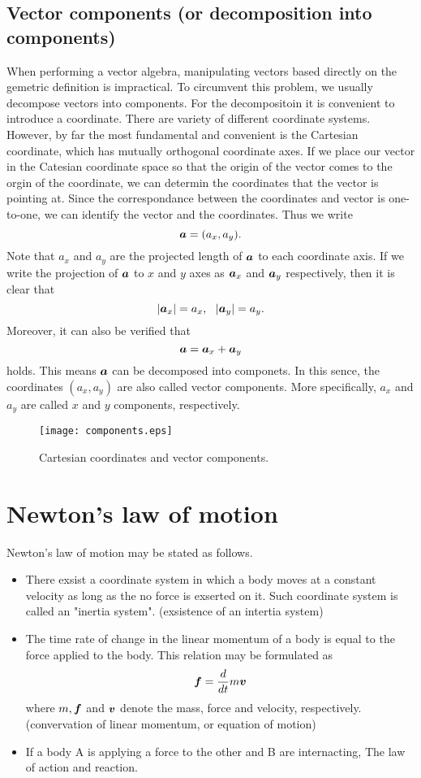 \documentclass[10pt,a4j]{article}
\begin{document}
\subsection{Vector components (or decomposition into components)}
When performing a vector algebra, manipulating vectors based directly on the gemetric 
definition is impractical. 
To circumvent this problem, we usually decompose vectors into components. 
For the decompositoin it is convenient to introduce a coordinate. 
There are variety of different coordinate systems. However, by far the most 
fundamental and convenient is the Cartesian coordinate, which has mutually 
orthogonal coordinate axes. 
If we place our vector in the Catesian coordinate space so that the origin of the 
vector comes to the orgin of the coordinate, we can determin the coordinates 
that the vector is pointing at. 
Since the correspondance between the coordinates and vector is one-to-one, we can 
identify the vector and the coordinates. Thus we write
\[
	\mbox{\boldmath $a$}=(a_x, a_y).
\]
Note that $a_x$ and $a_y$ are the projected length of $\mbox{\boldmath $a$}$ to each coordinate axis.
If we write the projection of $\mbox{\boldmath $a$}$ to $x$ and $y$ axes as $\mbox{\boldmath $a$}_x$ and $\mbox{\boldmath $a$}_y$ respectively, 
then it is clear that 
\begin{equation}
	|\mbox{\boldmath $a$}_x|=a_x, \ \ |\mbox{\boldmath $a$}_y|=a_y.
	\label{eqn:}
\end{equation}
Moreover, it can also be verified that 
\begin{equation}
	\mbox{\boldmath $a$}=\mbox{\boldmath $a$}_x+\mbox{\boldmath $a$}_y
	\label{eqn:}
\end{equation}
holds.  This means $\mbox{\boldmath $a$}$ can be decomposed into componets. 
In this sence, the coordinates $(a_x,a_y)$ are also called vector components. 
More specifically, $a_x$ and $a_y$ are called $x$ and $y$ components, respectively.
\begin{figure}[h]
	\begin{center}
	\texttt{[image: components.eps]} 
	\end{center}
	\caption{Cartesian coordinates and vector components.} 
	\label{fig:fig1_6}
\end{figure}
\section{Newton's law of motion}
Newton's law of motion may be stated as follows.
\begin{itemize}
\item 
	There exsist a coordinate system in which a body moves at a constant velocity as long as the 
	no force is exserted on it. Such coordinate system is called an "inertia system".
		(exsistence of an intertia system)
\item
	The time rate of change in the linear momentum of a body is equal to the force applied to the body. 
	This relation may be formulated as 
	\[
		\mbox{\boldmath $f$}=\frac{d}{dt}m\mbox{\boldmath $v$}
	\]
		where $m, \mbox{\boldmath $f$}$ and $\mbox{\boldmath $v$}$ denote the mass, force and velocity, respectively. 
	(convervation of linear momentum, or equation of motion)
\item
	If a body A is applying a force to the other and B are internacting, 
	The law of action and reaction.
\end{itemize}
\end{document}
